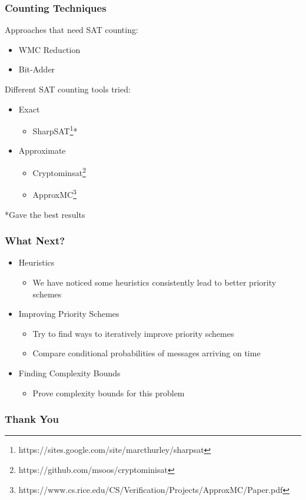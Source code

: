 \documentclass{beamer}
\begin{document}
\begin{frame}
\frametitle{Counting Techniques}
	Approaches that need SAT counting:
	\begin{itemize}
		\item WMC Reduction
		\item Bit-Adder\\[2ex]
	\end{itemize}

	Different SAT counting tools tried:
	\begin{itemize}
	\item Exact
		\begin{itemize}
		\item SharpSAT\footnote{https://sites.google.com/site/marcthurley/sharpsat}*
		\end{itemize}

	\item Approximate
		\begin{itemize}
		\item Cryptominsat\footnote{https://github.com/msoos/cryptominisat}
		\item ApproxMC\footnote{https://www.cs.rice.edu/CS/Verification/Projects/ApproxMC/Paper.pdf}\\[3ex]
		\end{itemize}
	\end{itemize}
	*Gave the best results
\end{frame}

\begin{frame}
\frametitle{What Next?}
	\begin{itemize}
	\item Heuristics
		\begin{itemize}
		\item We have noticed some heuristics consistently lead to better priority schemes
		\end{itemize}
	\item Improving Priority Schemes
		\begin{itemize}
		\item Try to find ways to iteratively improve priority schemes
		\item Compare conditional probabilities of messages arriving on time
		\end{itemize}
	\item Finding Complexity Bounds
		\begin{itemize}
		\item Prove complexity bounds for this problem
		\end{itemize}
	\end{itemize}
\end{frame}


\begin{frame}
\frametitle{Thank You}
\end{frame}
\end{document}
